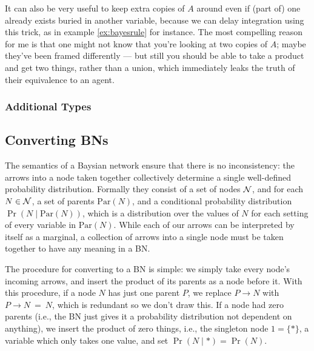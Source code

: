 \documentclass{article}
\begin{document}
	It can also be very useful to keep extra copies of $A$ around even if (part of) one already exists buried in another variable, because we can delay integration using this trick, as in example \ref{ex:bayesrule} for instance. The most compelling reason for me is that one might not know that you're looking at two copies of $A$; maybe they've been framed differently --- but still you should be able to take a product and get two things, rather than a union, which immediately leaks the truth of their equivalence to an agent.
	
	\subsubsection{Additional Types}
	
	
	
	
	
	
	\subsection{Converting BNs}\label{sec:convert2bn}
	The semantics of a Baysian network ensure that there is no inconsistency: the arrows into a node taken together collectively determine a single well-defined probability distribution. Formally they consist of a set of nodes $\cal N$, and for each $N \in \cal N$, a set of parents $\mathrm{Par}(N)$, and a conditional probability distribution $\Pr( N \mid \mathrm{Par}(N))$, which is a distribution over the values of $N$ for each setting of every variable in $\mathrm{Par}(N)$. While each of our arrows can be interpreted by itself as a marginal, a collection of arrows into a single node must be taken together to have any meaning in a BN. 
	
	The procedure for converting to a BN is simple: we simply take every node's incoming arrows, and insert the product of its parents as a node before it. With this procedure, if a node $N$ has just one parent $P$, we replace $P \to N$ with $P \to N ~=~ N$, which is redundant so we don't draw this. If a node had zero parents (i.e., the BN just gives it a probability distribution not dependent on anything), we insert the product of zero things, i.e., the singleton node $1 = \{*\}$, a variable which only takes one value, and set $\Pr(N \mid *) = \Pr(N)$. 
	
\end{document}
